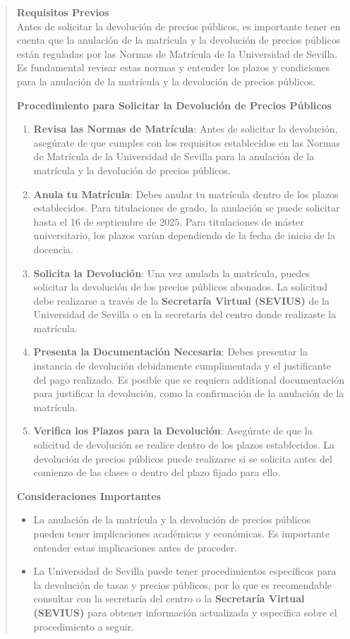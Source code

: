 \documentclass[12pt,a4paper,oneside]{report}
\begin{document}
\begin{itemize}
\begin{itemize}
\begin{quote}
\noindent\textbf{Requisitos Previos}\\
Antes de solicitar la devolución de precios públicos, es importante tener en cuenta que la anulación de la matrícula y la devolución de precios públicos están reguladas por las Normas de Matrícula de la Universidad de Sevilla. Es fundamental revisar estas normas y entender los plazos y condiciones para la anulación de la matrícula y la devolución de precios públicos.


\noindent\textbf{Procedimiento para Solicitar la Devolución de Precios Públicos}\\
\begin{enumerate}
  \item \textbf{Revisa las Normas de Matrícula}: Antes de solicitar la devolución, asegúrate de que cumples con los requisitos establecidos en las Normas de Matrícula de la Universidad de Sevilla para la anulación de la matrícula y la devolución de precios públicos.
  \item \textbf{Anula tu Matrícula}: Debes anular tu matrícula dentro de los plazos establecidos. Para titulaciones de grado, la anulación se puede solicitar hasta el 16 de septiembre de 2025. Para titulaciones de máster universitario, los plazos varían dependiendo de la fecha de inicio de la docencia.
  \item \textbf{Solicita la Devolución}: Una vez anulada la matrícula, puedes solicitar la devolución de los precios públicos abonados. La solicitud debe realizarse a través de la \textbf{Secretaría Virtual (SEVIUS)} de la Universidad de Sevilla o en la secretaría del centro donde realizaste la matrícula.
  \item \textbf{Presenta la Documentación Necesaria}: Debes presentar la instancia de devolución debidamente cumplimentada y el justificante del pago realizado. Es posible que se requiera additional documentación para justificar la devolución, como la confirmación de la anulación de la matrícula.
  \item \textbf{Verifica los Plazos para la Devolución}: Asegúrate de que la solicitud de devolución se realice dentro de los plazos establecidos. La devolución de precios públicos puede realizarse si se solicita antes del comienzo de las clases o dentro del plazo fijado para ello.
\end{enumerate}


\noindent\textbf{Consideraciones Importantes}\\
\begin{itemize}
  \item La anulación de la matrícula y la devolución de precios públicos pueden tener implicaciones académicas y económicas. Es importante entender estas implicaciones antes de proceder.
  \item La Universidad de Sevilla puede tener procedimientos específicos para la devolución de tasas y precios públicos, por lo que es recomendable consultar con la secretaría del centro o la \textbf{Secretaría Virtual (SEVIUS)} para obtener información actualizada y específica sobre el procedimiento a seguir.
\end{itemize}


\end{quote}
\end{itemize}
\end{itemize}
\end{document}
